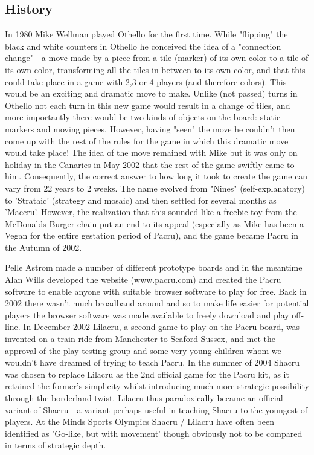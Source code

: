 \documentclass[a4paper]{article}
\begin{document}
\subsection{History}
In 1980 Mike Wellman played Othello for the first time. While "flipping" the black and white counters in Othello he conceived the idea of a "connection change" - a move made by a piece from a tile (marker) of its own color to a tile of its own color, transforming all the tiles in between to its own color, and that this could take place in a game with 2,3 or 4 players (and therefore colors). This would be an exciting and dramatic move to make. Unlike (not passed) turns in Othello not each turn in this new game would result in a change of tiles, and more importantly there would be two kinds of objects on the board: static markers and moving pieces. However, having "seen" the move he couldn't then come up with the rest of the rules for the game in which this dramatic move would take place! The idea of the move remained with Mike but it was only on holiday in the Canaries in May 2002 that the rest of the game swiftly came to him. Consequently, the correct answer to how long it took to create the game can vary from 22 years to 2 weeks. The name evolved from "Nines" (self-explanatory) to 'Strataic' (strategy and mosaic) and then settled for several months as 'Maccru'. However, the realization that this sounded like a freebie toy from the McDonalds Burger chain put an end to its appeal (especially as Mike has been a Vegan for the entire gestation period of Pacru), and the game became Pacru in the Autumn of 2002.

Pelle Astrom made a number of different prototype boards and in the meantime Alan Wills developed the website (www.pacru.com)\cite{pacru} and created the Pacru software to enable anyone with suitable browser software to play for free. Back in 2002 there wasn't much broadband around and so to make life easier for potential players the browser software was made available to freely download and play off-line. In December 2002 Lilacru, a second game to play on the Pacru board, was invented on a train ride from Manchester to Seaford Sussex, and met the approval of the play-testing group and some very young children whom we wouldn't have dreamed of trying to teach Pacru. 
In the summer of 2004 Shacru was chosen to replace Lilacru as the 2nd official game for the Pacru kit, as it retained the former's simplicity whilst introducing much more strategic possibility through the borderland twist. Lilacru thus paradoxically became an official variant of Shacru - a variant perhaps useful in teaching Shacru to the youngest of players. At the Minds Sports Olympics Shacru / Lilacru have often been identified as 'Go-like, but with movement' though obviously not to be compared in terms of strategic depth. 
\end{document}
